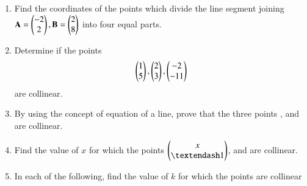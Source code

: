 \begin{enumerate}[label=\arabic*.,ref=\thesubsection.\theenumi]
\\
\solution

\item Find the coordinates of the points which divide the line segment joining $\mathbf{A}=\begin{pmatrix}-2\\2\end{pmatrix}, \mathbf{B}=\begin{pmatrix}2\\8\end{pmatrix}$ into four equal parts.
\item Determine if the points 
\begin{align}
\begin{pmatrix}1\\5\end{pmatrix}, \begin{pmatrix}2\\3\end{pmatrix}, \begin{pmatrix}-2\\-11\end{pmatrix}
\end{align}
%
are collinear.	
\item By using the concept of equation of a line, prove that the three points ,  and  are collinear.
\item Find the value of $x$ for which the points $\myvec{x\\ – 1}$,  and  are collinear.
\item  In each of the following, find the value of $k$ for which the points are collinear


\end{enumerate}
